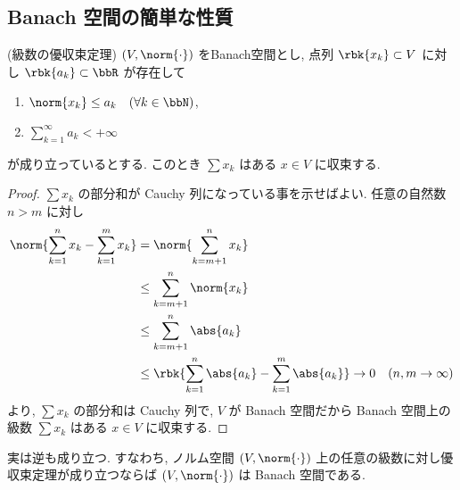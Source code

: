 \documentclass[openany, a4paper, oneside]{jsbook}
\begin{document}
\subsection{Banach 空間の簡単な性質}

\begin{prop}(級数の優収束定理)\label{introductory-study-function-spaces1}
 $(V, \norm{\cdot})$ をBanach空間とし, 点列 $\rbk{x_k} \subset V$ に対し $\rbk{a_k} \subset \bbR$ が存在して
\begin{enumerate}
\item $\norm{x_k} \leq a_k \quad (\forall k \in \bbN)$,
\item $\sum_{k=1}^{\infty} a_k < +\infty$
\end{enumerate}
が成り立っているとする.
このとき $\sum x_k$ はある $x \in V$ に収束する.
\end{prop}
\begin{proof}
$\sum x_k$ の部分和が Cauchy 列になっている事を示せばよい.
任意の自然数 $n > m$ に対し
\begin{align*}
 \norm{\sum_{k=1}^{n} x_k - \sum_{k=1}^{m} x_k}
 &=
 \norm{\sum_{k=m+1}^{n} x_k} \\
 &\leq
 \sum_{k=m+1}^{n} \norm{x_k} \\
 &\leq
 \sum_{k=m+1}^{n} \abs{a_k} \\
 &\leq
 \rbk{\sum_{k=1}^{n} \abs{a_k} - \sum_{k=1}^{m} \abs{a_k}} \to 0 \quad (n, m \to \infty)
\end{align*}
より, $\sum x_k$ の部分和は Cauchy 列で, $V$ が Banach 空間だから
Banach 空間上の級数 $\sum x_k$ はある $x\in V$ に収束する.
\end{proof}
\begin{rem}
実は逆も成り立つ.
すなわち, ノルム空間 $(V, \norm{\cdot})$ 上の任意の級数に対し優収束定理が成り立つならば $(V, \norm{\cdot})$ は Banach 空間である.
\end{rem}
\end{document}
